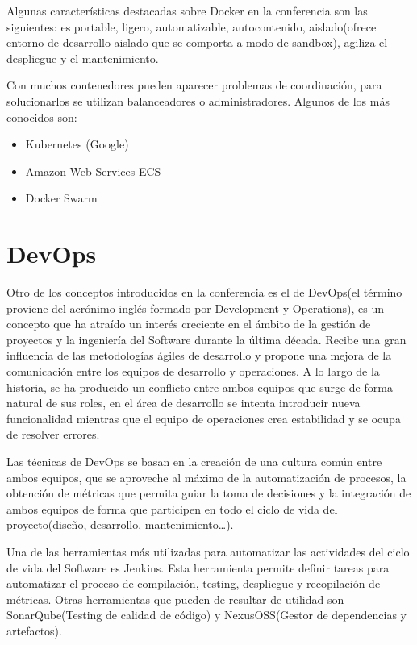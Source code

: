 Algunas características destacadas sobre Docker en la conferencia son las siguientes: es portable, ligero, automatizable, autocontenido, aislado(ofrece entorno de desarrollo aislado que se comporta a modo de sandbox), agiliza el despliegue y el mantenimiento.

Con muchos contenedores pueden aparecer problemas de coordinación, para solucionarlos se utilizan balanceadores o administradores. Algunos de los más conocidos son:
\begin{itemize}
\item Kubernetes (Google)
\item Amazon Web Services ECS
\item Docker Swarm
\end{itemize}

\section{DevOps}

Otro de los conceptos introducidos en la conferencia es el de DevOps(el término proviene del acrónimo inglés formado por Development y Operations), es un concepto que ha atraído un interés creciente en el ámbito de la gestión de proyectos y la ingeniería del Software durante la última década. Recibe una gran influencia de las metodologías ágiles de desarrollo y propone una mejora de la comunicación entre los equipos de desarrollo y operaciones. A lo largo de la historia, se ha producido un conflicto entre ambos equipos que surge de forma natural de sus roles, en el área de desarrollo se intenta introducir nueva funcionalidad mientras que el equipo de operaciones crea estabilidad y se ocupa de resolver errores. 

Las técnicas de DevOps se basan en la creación de una cultura común entre ambos equipos, que se aproveche al máximo de la automatización de procesos, la obtención de métricas que permita guiar la toma de decisiones y la integración de ambos equipos de forma que participen en todo el ciclo de vida del proyecto(diseño, desarrollo, mantenimiento…).

Una de las herramientas más utilizadas para automatizar las actividades del ciclo de vida del Software es Jenkins. Esta herramienta permite definir tareas para automatizar el proceso de compilación, testing, despliegue y recopilación de métricas. Otras herramientas que pueden de resultar de utilidad son SonarQube(Testing de calidad de código) y NexusOSS(Gestor de dependencias y artefactos).



